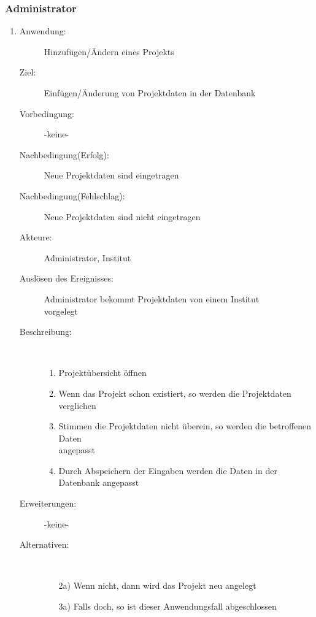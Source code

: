 \documentclass[parskip=full]{scrartcl}
\newcommand{\swtLabel}[1]{\textbf{/#1\arabic*0/}}
\begin{document}
\subsubsection{Administrator}
\begin{enumerate} [label=\swtLabel{A}]
  \item
    \begin{description}
  	\item[Anwendung:] Hinzufügen/Ändern eines Projekts
  	\item[Ziel:] Einfügen/Änderung von Projektdaten in der Datenbank
  	\item[Vorbedingung:] -keine-
  	\item[Nachbedingung(Erfolg):] Neue Projektdaten sind eingetragen
  	\item[Nachbedingung(Fehlschlag):] Neue Projektdaten sind nicht eingetragen
  	\item[Akteure:] Administrator, Institut
  	\item[Auslösen des Ereignisses:] Administrator bekommt Projektdaten von einem
  	Institut\\ vorgelegt
  	\item[Beschreibung:]~
  	\begin{enumerate} 
  	  \item Projektübersicht öffnen
  	  \item Wenn das Projekt schon existiert, so werden die Projektdaten
  	  verglichen
  	  \item Stimmen die Projektdaten nicht überein, so werden die betroffenen
  	  Daten\\ angepasst
  	  \item Durch Abspeichern der Eingaben werden die Daten in der Datenbank
  	  angepasst
  	\end{enumerate}
  	\item[Erweiterungen:] -keine-
  	\item[Alternativen:]~
  	\begin{enumerate}
  	  \item[2a)] Wenn nicht, dann wird das Projekt neu angelegt
  	  \item[3a)] Falls doch, so ist dieser Anwendungsfall abgeschlossen
  	\end{enumerate} 
  \end{description}
   

\end{enumerate}
\end{document}
